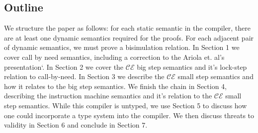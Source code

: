 \subsection{Outline}
We structure the paper as follows: for each static semantic in the compiler,
there are at least one dynamic semantics required for the proofs. For each
adjacent pair of dynamic semantics, we must prove a bisimulation relation.
In Section 1 we cover call by need semantics, including a correction to the
Ariola et. al's presentation`\cite{ariola1995call}. In Section 2 we cover the
$\mathcal{CE}$ big step semantics and it's lock-step relation to call-by-need.
In Section 3 we describe the $\mathcal{CE}$ small step semantics and how it
relates to the big step semantics. We finish the chain in Section 4, describing
the instruction machine semantics and it's relation to the $\mathcal{CE}$ small
step semantics. While this compiler is untyped, we use Section 5 to discuss how
one could incorporate a type system into the compiler. We then discuss threats
to validity in Section 6 and conclude in Section 7. 

